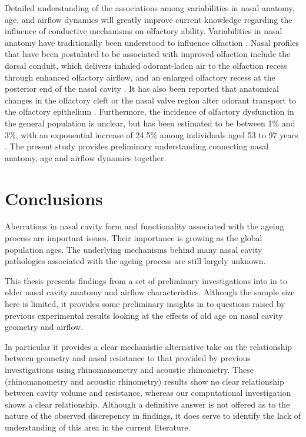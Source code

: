 Detailed understanding of the associations among variabilities in nasal anatomy, age, and airflow dynamics will greatly improve current knowledge regarding the influence of conductive mechanisms on olfactory ability. Variabilities in nasal 
anatomy have traditionally been understood to influence olfaction \cite{Eiting2015, Craven2007}. Nasal profiles that have been postulated to be associated with improved olfaction include the dorsal conduit, which delivers inhaled odorant-laden air to the olfaction recess through enhanced olfactory airflow, and an enlarged olfactory recess at the posterior end of the nasal cavity \cite{Eiting2015, Craven2007, Eiting2014}. It has also been reported that anatomical changes in the olfactory cleft or the nasal valve region alter odorant transport to the olfactory epithelium \cite{Zhao2004a}. Furthermore, the incidence of olfactory dysfunction in the general population is unclear, but has been estimated to be between 1\% and 3\%, with an exponential increase of 24.5\% among individuals aged 53 to 97 years \cite{Landis2004, Braemerson2004, Wysocki1989, Hoffman1998, Murphy2002}. The present study provides preliminary understanding connecting nasal anatomy, age and airflow dynamics together.

\section{Conclusions}
Aberrations in nasal cavity form and functionality associated with the ageing process are important issues. 
Their importance is growing as the global population ages.
The underlying mechanisms behind many nasal cavity pathologies associated with the ageing process are still largely unknown.

This thesis presents findings from a set of preliminary investigations into in to older nasal cavity anatomy and airflow characteristics.
Although the sample size here is limited, it provides some preliminary insights in to questions raised by previous experimental results looking at the effects of old age on nasal cavity geometry and airflow.

In particular it provides a clear mechanistic alternative take on the relationship between geometry and nasal resistance to that provided by previous investigations using rhinomanometry and acoustic rhinometry. These (rhinomanometry and acoustic rhinometry) results show no clear relationship between cavity volume and resistance, whereas our computational investigation shows a clear relationship. Although a definitive answer is not offered as to the nature of the observed discrepency in findings, it does serve to identify the lack of understanding of this area in the current literature.

